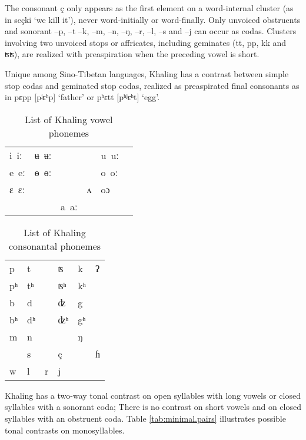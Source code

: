 \documentclass[oldfontcommands,oneside,a4paper,11pt]{article}
\newcommand{\ipa}[1]{{\phon \mbox{#1}}} %
\begin{document}
The consonant \ipa{ç} only appears as the first element on a word-internal cluster (as in \ipa{seçki} `we kill it'), never word-initially or word-finally. Only unvoiced obstruents and sonorant \ipa{--p}, \ipa{--t} \ipa{--k}, \ipa{--m}, \ipa{--n}, \ipa{--ŋ}, \ipa{--r}, \ipa{--l}, \ipa{--s} and \ipa{--j} can occur as codas. Clusters involving two unvoiced stops or affricates, including geminates (\ipa{tt}, \ipa{pp}, \ipa{kk} and \ipa{ʦʦ}), are realized with preaspiration when the preceding vowel is short.

Unique among Sino-Tibetan languages, Khaling has a contrast between simple stop codas and geminated stop codas, realized as preaspirated final consonants as in \ipa{pɛpp} [pʲɛʰp] `father'  or \ipa{pʰɛtt} [pʰʲɛʰt] `egg'.

\begin{table}[H]
\caption{List of Khaling vowel phonemes} \label{tab:vowels}\centering
\begin{tabular}{llllll}
\ipa{i iː} & \ipa{ʉ ʉː} & &&\ipa{u uː} \\
\ipa{e eː} & \ipa{ɵ ɵː} & &&\ipa{o oː} \\
\ipa{ɛ ɛː} &   & &\ipa{ʌ} &  \ipa{oɔ} \\
&&\ipa{a aː}\\
\end{tabular}
\end{table}

\begin{table}[H]
\caption{List of Khaling consonantal phonemes} \label{tab:consonants}\centering
\begin{tabular}{llllll}
\ipa{p} & \ipa{t} &&\ipa{ʦ}  & \ipa{k}&\ipa{ʔ}\\
\ipa{pʰ} & \ipa{tʰ} &&\ipa{ʦʰ}  & \ipa{kʰ}&\\
\ipa{b} & \ipa{d} &&\ipa{ʣ}  & \ipa{g}&\\
\ipa{bʰ} & \ipa{dʰ} &&\ipa{ʣʰ}  & \ipa{gʰ}&\\
\ipa{m} & \ipa{n} && & \ipa{ŋ}&\\
  & \ipa{s} && \ipa{ç}& &\ipa{ɦ}\\
  \ipa{w} & \ipa{l} &\ipa{r}&\ipa{j}  & &\\
\end{tabular}
\end{table}

Khaling has a two-way tonal contrast on open syllables with long vowels or closed syllables with a sonorant coda; There is no contrast on short vowels and on closed syllables with an obstruent coda. Table \ref{tab:minimal.pairs} illustrates possible tonal contrasts on monosyllables.
\end{document}
